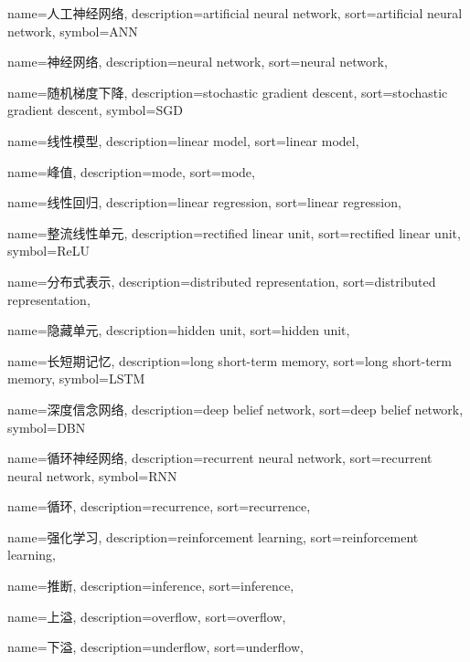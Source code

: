 {
  name=人工神经网络,
  description={artificial neural network},
  sort={artificial neural network},
  symbol={ANN}
}

{
  name=神经网络,
  description={neural network},
  sort={neural network},
}

{
  name=随机梯度下降,
  description={stochastic gradient descent},
  sort={stochastic gradient descent},
  symbol={SGD}
}

{
  name=线性模型,
  description={linear model},
  sort={linear model},
}

{
  name=峰值,
  description={mode},
  sort={mode},
}

{
  name=线性回归,
  description={linear regression},
  sort={linear regression},
}

{
  name=整流线性单元,
  description={rectified linear unit},
  sort={rectified linear unit},
  symbol={ReLU}
}

{
  name=分布式表示,
  description={distributed representation},
  sort={distributed representation},
}

{
  name=隐藏单元,
  description={hidden unit},
  sort={hidden unit},
}

{
  name=长短期记忆,
  description={long short-term memory},
  sort={long short-term memory},
  symbol={LSTM}
}

{
  name=深度信念网络,
  description={deep belief network},
  sort={deep belief network},
  symbol={DBN}
}

{
  name=循环神经网络,
  description={recurrent neural network},
  sort={recurrent neural network},
  symbol={RNN}
}

{
  name=循环,
  description={recurrence},
  sort={recurrence},
}

{
  name=强化学习,
  description={reinforcement learning},
  sort={reinforcement learning},
}

{
  name=推断,
  description={inference},
  sort={inference},
}

{
  name=上溢,
  description={overflow},
  sort={overflow},
}

{
  name=下溢,
  description={underflow},
  sort={underflow},
}

